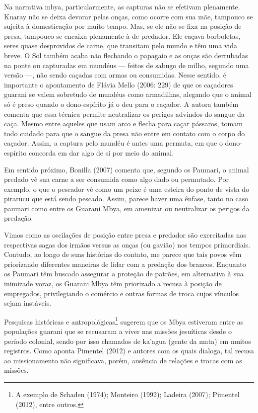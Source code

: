 Na narrativa mbya, particularmente, as capturas não se efetivam
plenamente. Kuaray não se deixa devorar pelas onças, como ocorre com
sua mãe, tampouco se sujeita à domesticação por muito tempo. Mas, se
ele não se fixa na posição de presa, tampouco se encaixa plenamente à
de predador. Ele caçava borboletas, seres quase desprovidos de carne,
que transitam pelo mundo e têm uma vida breve. O Sol também acaba não
flechando o papagaio e as onças são derrubadas na ponte ou capturadas
em mundéus --- feitos de sabugo de milho, segundo uma versão ---, não sendo
caçadas com armas ou consumidas. Nesse sentido, é importante o
apontamento de Flávia Mello (2006: 229) de que os caçadores guarani se
valem sobretudo de mundéus como armadilhas, alegando que o animal só é
preso quando o dono-espírito já o deu para o caçador. A autora também
comenta que essa técnica permite neutralizar os perigos advindos do
sangue da caça. Mesmo entre aqueles que usam arco e flecha para caçar
pássaros, tomam todo cuidado para que o sangue da presa não entre em
contato com o corpo do caçador. Assim, a captura pelo mundéu é antes
uma permuta, em que o dono-espírito concorda em dar algo de si por meio
do animal.

Em sentido próximo, Bonilla (2007) comenta que, segundo os Paumari, o
animal predado vê sua carne a ser consumida como algo dado ou
permutado. Por exemplo, o que o pescador vê como um peixe é uma esteira
do ponto de vista do pirarucu que está sendo pescado. Assim, parece
haver uma ênfase, tanto no caso paumari como entre os Guarani Mbya, em
amenizar ou neutralizar os perigos da predação. 

Vimos como as oscilações de posição entre presa e predador são
exercitadas nas respectivas sagas dos irmãos versus as onças (ou
gavião) nos tempos primordiais. Contudo, ao longo de suas histórias do
contato, me parece que tais povos vêm priorizando diferentes maneiras
de lidar com a predação dos brancos. Enquanto os Paumari têm buscado
assegurar a proteção de patrões, em alternativa à sua inimizade voraz,
os Guarani Mbya têm priorizado a recusa à posição de empregados,
privilegiando o comércio e outras formas de troca cujos vínculos sejam
instáveis.

Pesquisas históricas e antropológicas\footnote{A exemplo de Schaden
(1974); Monteiro (1992); Ladeira (2007); Pimentel (2012), entre
outros.} sugerem que os Mbya estiveram entre as populações guarani que
se recusaram a viver nas missões jesuíticas desde o período colonial,
sendo por isso chamados de ka’agua (gente da mata) em muitos registros.
Como aponta Pimentel (2012) e autores com os quais dialoga, tal recusa
ao missionamento não significava, porém, ausência de relações e trocas
com as missões.

